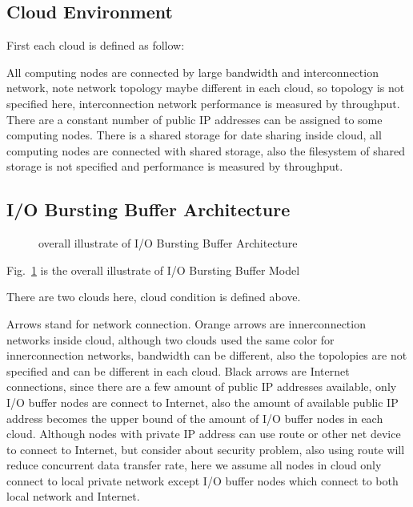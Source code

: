 \documentclass[JIP,draft]{ipsj}
\begin{document}


\subsection{Cloud Environment}
First each cloud is defined as follow:

All computing nodes are connected by large bandwidth and interconnection network, note network topology maybe different in each cloud, so topology is not specified here, interconnection network performance is measured by throughput.
There are a constant number of public IP addresses can be assigned to some computing nodes.
There is a shared storage for date sharing inside cloud, all computing nodes are connected with shared storage, also the filesystem of shared storage is not specified and performance is measured by throughput.


\subsection{I/O Bursting Buffer Architecture}

\begin{figure}[tb]
	\centering
	\caption{overall illustrate of I/O Bursting Buffer Architecture}
	\label{overview}
\end{figure}

Fig.~\ref{overview} is the overall illustrate of I/O Bursting Buffer Model

There are two clouds here, cloud condition is defined above.

Arrows stand for network connection.
Orange arrows are innerconnection networks inside cloud, although two clouds used the same color for innerconnection networks, bandwidth can be different, also the topolopies are not specified and can be different in each cloud.
Black arrows are Internet connections, since there are a few amount of public IP addresses available, only I/O buffer nodes are connect to Internet, also the amount of available public IP address becomes the upper bound of the amount of I/O buffer nodes in each cloud. 
Although nodes with private IP address can use route or other net device to connect to Internet, but consider about security problem, also using route will reduce concurrent data transfer rate, here we assume all nodes in cloud only connect to local private network except I/O buffer nodes which connect to both local network and Internet.
\end{document}

